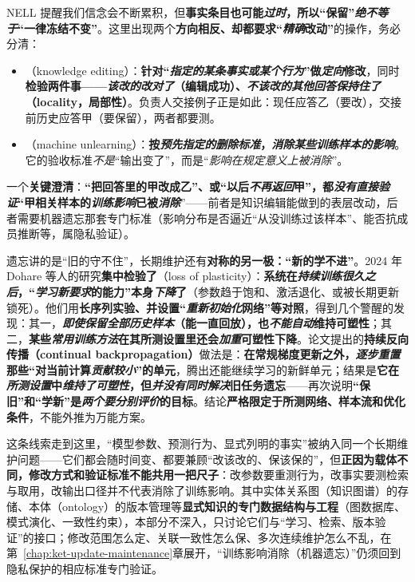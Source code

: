 NELL 提醒我们信念会不断累积，但\textbf{事实条目也可能\emph{过时}，所以“保留”\emph{绝不等于}“一律冻结不变”}。这里出现两个\textbf{方向相反、却都要求“\emph{精确}改动”}的操作，务必分清：
\begin{itemize}\item {}（knowledge editing）：\textbf{针对“\emph{指定的某条事实或某个行为}”做\emph{定向}修改}，同时\textbf{检验两件事——\emph{该改的改对了}（编辑成功）、\emph{不该改的\emph{其他}回答\emph{保持}住了}（locality，局部性）}。负责人交接例子正是如此：现任应答乙（要改），交接前历史应答甲（要保留），两者都要测。\item {}（machine unlearning）：\textbf{按\emph{预先指定的删除标准}，\emph{消除某些训练样本的影响}}。它的验收标准\emph{不是}“输出变了”，而是“\emph{影响}\emph{在规定意义上被消除}”。\end{itemize}
一个\textbf{关键澄清}：\textbf{“把回答里的甲改成乙”、或“以后\emph{不再返回}甲”，都\emph{没有直接验证}“甲相关样本的\emph{训练影响}已被\emph{消除}}”——前者是知识编辑能做到的表层改动，后者需要机器遗忘那套专门标准（影响分布是否逼近“从没训练过该样本”、能否抗成员推断等，属隐私验证）。

遗忘讲的是“旧的守不住”，长期维护还有\textbf{对称的另一极：“新的学不进”}。2024 年 Dohare 等人的研究\textbf{集中检验了}（loss of plasticity）：\textbf{系统在\emph{持续训练很久之后}，“\emph{学习\emph{新}要求}的能力”本身\emph{下降}了}（参数趋于饱和、激活退化、或被长期更新锁死）。他们用\textbf{长序列实验、并设置“\emph{重新初始化}网络”等对照}，得到几个警醒的发现：其一，\textbf{\emph{即使保留全部历史样本}（能一直回放），也\emph{不能自动}维持可塑性}；其二，\textbf{某些\emph{常用训练方法}在其所测设置里还会\emph{加重}可塑性下降}。论文提出的\textbf{持续反向传播（continual backpropagation）}做法是：\textbf{在常规梯度更新之外，\emph{逐步重置}那些“对当前计算\emph{贡献较小}”的单元}，腾出还能继续学习的新鲜单元；结果是\textbf{它在\emph{所测设置}中\emph{维持了可塑性}，但\emph{并没有同时解决}旧任务遗忘}——再次说明\textbf{“保旧”和“学新”是\emph{两个要分别评价}的目标}。结论\textbf{严格限定于所测网络、样本流和优化条件}，不能外推为万能方案。

这条线索走到这里，“模型参数、预测行为、显式列明的事实”被纳入同一个长期维护问题——它们都会随时间变、都要兼顾“改该改的、保该保的”，但\textbf{正因为载体不同，修改方式和验证标准不能共用一把尺子}：改参数要重测行为，改事实要测检索与取用，改输出口径并不代表消除了训练影响。其中实体关系图（知识图谱）的存储、本体（ontology）的版本管理等\textbf{显式知识的专门数据结构与工程}（图数据库、模式演化、一致性约束），本部分不深入，只讨论它们与“学习、检索、版本验证”的接口；修改范围怎么定、关联一致性怎么保、多次连续维护怎么不乱，在第~\ref{chap:ket-update-maintenance}章展开，“训练影响消除（机器遗忘）”仍须回到隐私保护的相应标准专门验证。


